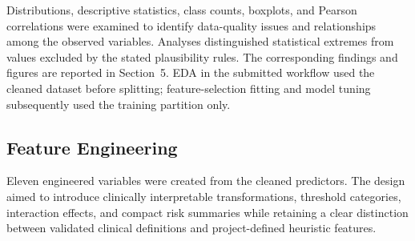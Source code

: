 \documentclass[11pt,a4paper]{article}
\begin{document}
Distributions, descriptive statistics, class counts, boxplots, and Pearson correlations were examined to identify data-quality issues and relationships among the observed variables. Analyses distinguished statistical extremes from values excluded by the stated plausibility rules. The corresponding findings and figures are reported in Section~5. EDA in the submitted workflow used the cleaned dataset before splitting; feature-selection fitting and model tuning subsequently used the training partition only.

\subsection{Feature Engineering}

Eleven engineered variables were created from the cleaned predictors. The design aimed to introduce clinically interpretable transformations, threshold categories, interaction effects, and compact risk summaries while retaining a clear distinction between validated clinical definitions and project-defined heuristic features.
\end{document}
